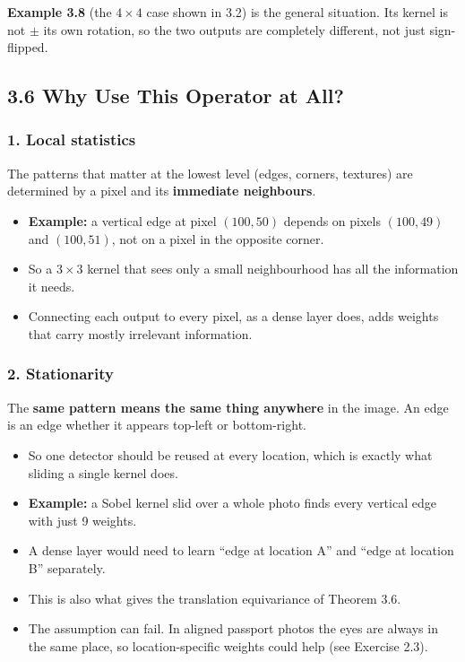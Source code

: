 \textbf{Example 3.8} (the $4 \times 4$ case shown in 3.2) is the general situation. Its kernel is not $\pm$ its own rotation, so the two outputs are completely different, not just sign-flipped.


\subsection*{3.6 Why Use This Operator at All?}

\subsubsection*{1. Local statistics}
The patterns that matter at the lowest level (edges, corners, textures) are determined by a pixel and its \textbf{immediate neighbours}.
\begin{itemize}
  \item \textbf{Example:} a vertical edge at pixel $(100, 50)$ depends on pixels $(100, 49)$ and $(100, 51)$, not on a pixel in the opposite corner.
  \item So a $3 \times 3$ kernel that sees only a small neighbourhood has all the information it needs.
  \item Connecting each output to every pixel, as a dense layer does, adds weights that carry mostly irrelevant information.
\end{itemize}

\subsubsection*{2. Stationarity}
The \textbf{same pattern means the same thing anywhere} in the image. An edge is an edge whether it appears top-left or bottom-right.
\begin{itemize}
  \item So one detector should be reused at every location, which is exactly what sliding a single kernel does.
  \item \textbf{Example:} a Sobel kernel slid over a whole photo finds every vertical edge with just 9 weights.
  \item A dense layer would need to learn ``edge at location A'' and ``edge at location B'' separately.
  \item This is also what gives the translation equivariance of Theorem 3.6.
  \item The assumption can fail. In aligned passport photos the eyes are always in the same place, so location-specific weights could help (see Exercise 2.3).
\end{itemize}

